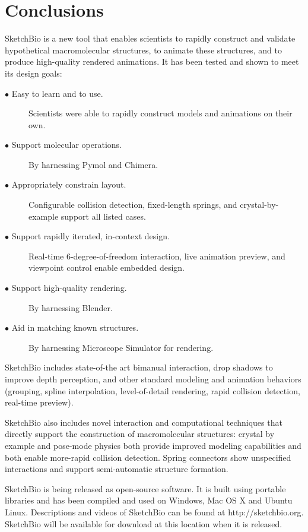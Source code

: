 \documentclass[twocolumn]{bmcart}%
\begin{document}
\section*{Conclusions}
SketchBio is a new tool that enables scientists to rapidly construct and validate hypothetical macromolecular structures, to animate these structures, and to produce high-quality rendered animations.
It has been tested and shown to meet its design goals:
\begin{description}
  \item[$\bullet$ Easy to learn and to use.] Scientists were able to rapidly construct models and animations on their own.
  \item[$\bullet$ Support molecular operations.] By harnessing Pymol and Chimera.
  \item[$\bullet$ Appropriately constrain layout.] Configurable collision detection, fixed-length springs, and crystal-by-example support all listed cases.
  \item[$\bullet$ Support rapidly iterated, in-context design.] Real-time 6-degree-of-freedom interaction, live animation preview, and viewpoint control enable embedded design.
  \item[$\bullet$ Support high-quality rendering.] By harnessing Blender.
  \item[$\bullet$ Aid in matching known structures.] By harnessing Microscope Simulator for rendering.
\end{description}

SketchBio includes state-of-the art bimanual interaction, drop shadows to improve depth perception, and other standard modeling and animation behaviors (grouping, spline interpolation, level-of-detail rendering, rapid collision detection, real-time preview).

SketchBio also includes novel interaction and computational techniques that directly support the construction of macromolecular structures: crystal by example and pose-mode physics both provide improved modeling capabilities and both enable more-rapid collision detection.
Spring connectors show unspecified interactions and support semi-automatic structure formation.

SketchBio is being released as open-source software.
It is built using portable libraries and has been compiled and used on Windows, Mac OS X and Ubuntu Linux.
Descriptions and videos of SketchBio can be found at http://sketchbio.org.
SketchBio will be available for download at this location when it is released.
\end{document}
